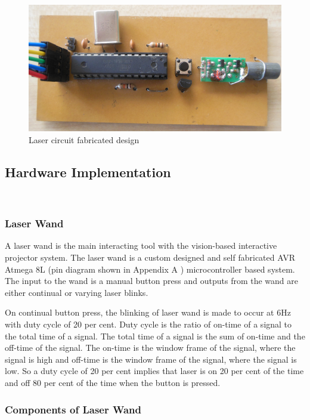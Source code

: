 \documentclass[12pt, a4paper]{article}
\begin{document}
{\begin{figure}[htp]
	\centering
	\includegraphics[scale=0.2]{front.png}
	\caption{Laser circuit fabricated design}
	\label{}
\end{figure}

\subsection{Hardware Implementation}
~\\
\subsubsection{Laser Wand}

A laser wand is the main interacting tool with the vision-based interactive projector system. The laser wand is a custom designed and self fabricated AVR Atmega 8L (pin diagram shown in Appendix A ) microcontroller based system. The input to the wand is a manual button press and outputs from the wand are either continual or varying laser blinks. 

On continual button press, the blinking of laser wand is made to occur at 6Hz with duty cycle of 20 per cent. Duty cycle is the ratio of on-time of a signal to the total time of a signal. The total time of a signal is the sum of on-time and the off-time of the signal. The on-time is the window frame of the signal, where the signal is high and off-time is the window frame of the signal, where the signal is low. So a duty cycle of 20 per cent implies that laser is on 20 per cent of the time and off 80 per cent of the time when the button is pressed. 

\subsubsection{Components of Laser Wand}

}
\end{document}
